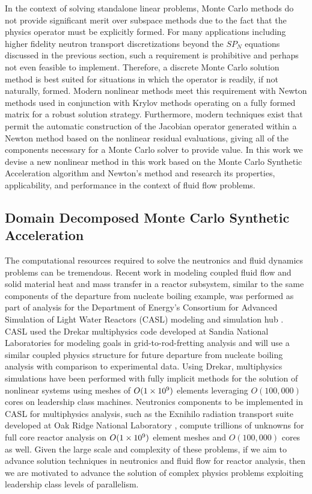 In the context of solving standalone linear problems, Monte Carlo
methods do not provide significant merit over subspace methods due to
the fact that the physics operator must be explicitly formed. For many
applications including higher fidelity neutron transport
discretizations beyond the $SP_N$ equations discussed in the previous
section, such a requirement is prohibitive and perhaps not even
feasible to implement. Therefore, a discrete Monte Carlo solution
method is best suited for situations in which the operator is readily,
if not naturally, formed. Modern nonlinear methods meet this
requirement with Newton methods used in conjunction with Krylov
methods operating on a fully formed matrix for a robust solution
strategy. Furthermore, modern techniques exist that permit the
automatic construction of the Jacobian operator generated within a
Newton method based on the nonlinear residual evaluations, giving all
of the components necessary for a Monte Carlo solver to provide
value. In this work we devise a new nonlinear method in this work
based on the Monte Carlo Synthetic Acceleration algorithm and Newton's
method and research its properties, applicability, and performance in
the context of fluid flow problems.

\subsection{Domain Decomposed Monte Carlo Synthetic Acceleration}
\label{subsec:parallel_motivation}

The computational resources required to solve the neutronics and fluid
dynamics problems can be tremendous. Recent work in modeling coupled
fluid flow and solid material heat and mass transfer in a reactor
subsystem, similar to the same components of the departure from
nucleate boiling example, was performed as part of analysis for the
Department of Energy's Consortium for Advanced Simulation of Light
Water Reactors (CASL) modeling and simulation hub
\cite{u.s._department_of_energy_casl_2011}. CASL used the Drekar
multiphysics code developed at Sandia National Laboratories
\cite{pawlowski_drekar_2012} for modeling goals in
grid-to-rod-fretting analysis and will use a similar coupled physics
structure for future departure from nucleate boiling analysis with
comparison to experimental data. Using Drekar, multiphysics
simulations have been performed with fully implicit methods for the
solution of nonlinear systems using meshes of $O(1\times 10^{9})$ elements
leveraging $O(100,000)$ cores on leadership class machines. Neutronics
components to be implemented in CASL for multiphysics analysis, such
as the Exnihilo radiation transport suite developed at Oak Ridge
National Laboratory \cite{evans_denovo:_2010}, compute trillions of
unknowns for full core reactor analysis on $O(1\times 10^{9})$ element
meshes and $O(100,000)$ cores as well. Given the large scale and
complexity of these problems, if we aim to advance solution techniques
in neutronics and fluid flow for reactor analysis, then we are
motivated to advance the solution of complex physics problems
exploiting leadership class levels of parallelism.

